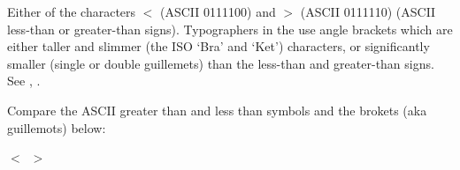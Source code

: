  Either of the characters $<$ (ASCII 0111100) and $>$ (ASCII 0111110) (ASCII less-than or greater-than signs). Typographers
in the  use angle brackets which are either taller and slimmer (the ISO `Bra' and `Ket') characters, or significantly
smaller (single or double guillemets) than the less-than and greater-than signs. See , .

\begin{new}
	Compare the ASCII greater than and less than symbols and the brokets (aka guillemots) below:
	\begin{center}
		\Huge
		$<$\ $>$\ \ \textlangle\ \textrangle\ \ \guilsinglleft\ \guilsinglright
	\end{center}
\end{new}

